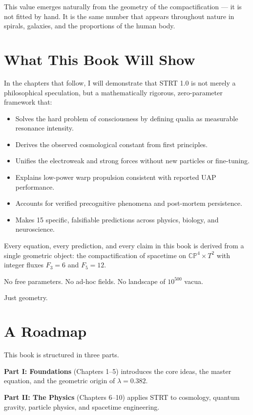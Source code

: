 This value emerges naturally from the geometry of the compactification — it is not fitted by hand. It is the same number that appears throughout nature in spirals, galaxies, and the proportions of the human body.

\section{What This Book Will Show}

In the chapters that follow, I will demonstrate that STRT 1.0 is not merely a philosophical speculation, but a mathematically rigorous, zero-parameter framework that:

\begin{itemize}
    \item Solves the hard problem of consciousness by defining qualia as measurable resonance intensity.
    \item Derives the observed cosmological constant from first principles.
    \item Unifies the electroweak and strong forces without new particles or fine-tuning.
    \item Explains low-power warp propulsion consistent with reported UAP performance.
    \item Accounts for verified precognitive phenomena and post-mortem persistence.
    \item Makes 15 specific, falsifiable predictions across physics, biology, and neuroscience.
\end{itemize}

Every equation, every prediction, and every claim in this book is derived from a single geometric object: the compactification of spacetime on $\mathbb{CP}^4 \times T^2$ with integer fluxes $F_3 = 6$ and $F_5 = 12$.

No free parameters. No ad-hoc fields. No landscape of $10^{500}$ vacua.

Just geometry.

\section{A Roadmap}

This book is structured in three parts.

\textbf{Part I: Foundations} (Chapters 1--5) introduces the core ideas, the master equation, and the geometric origin of $\lambda = 0.382$.

\textbf{Part II: The Physics} (Chapters 6--10) applies STRT to cosmology, quantum gravity, particle physics, and spacetime engineering.

